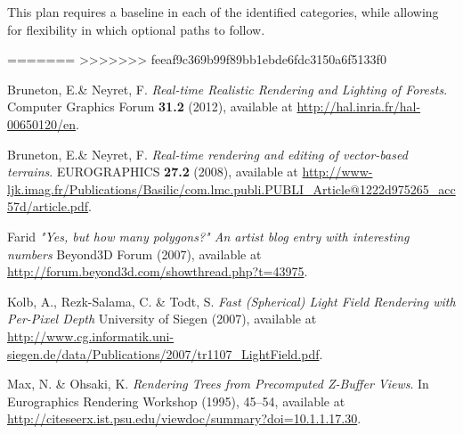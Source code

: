 \documentclass{article}
\begin{document}
This plan requires a baseline in each of the identified categories, while allowing for flexibility in which optional paths to follow.

=======
\newpage
>>>>>>> feeaf9c369b99f89bb1ebde6fdc3150a6f5133f0
\begin{thebibliography}{9}

  Bruneton, E.\& Neyret, F.
  \emph{Real-time Realistic Rendering and Lighting of Forests}.
  Computer Graphics Forum \textbf{31.2} (2012), available at
  \url{http://hal.inria.fr/hal-00650120/en}.

  Bruneton, E.\& Neyret, F.
  \emph{Real-time rendering and editing of vector-based terrains}.
  EUROGRAPHICS \textbf{27.2} (2008), available at
  \url{http://www-ljk.imag.fr/Publications/Basilic/com.lmc.publi.PUBLI_Article@1222d975265_acc57d/article.pdf}.

  Farid
  \emph{"Yes, but how many polygons?" An artist blog entry with interesting numbers}
  Beyond3D Forum (2007), available at
  \url{http://forum.beyond3d.com/showthread.php?t=43975}.

  Kolb, A., Rezk-Salama, C. \& Todt, S.
  \emph{Fast (Spherical) Light Field Rendering with Per-Pixel Depth}
  University of Siegen (2007), available at
  \url{http://www.cg.informatik.uni-siegen.de/data/Publications/2007/tr1107_LightField.pdf}.

  Max, N. \& Ohsaki, K.
  \emph{Rendering Trees from Precomputed Z-Buffer Views}.
  In Eurographics Rendering Workshop (1995), 45--54, available at
  \url{http://citeseerx.ist.psu.edu/viewdoc/summary?doi=10.1.1.17.30}.

\end{thebibliography}
\end{document}

